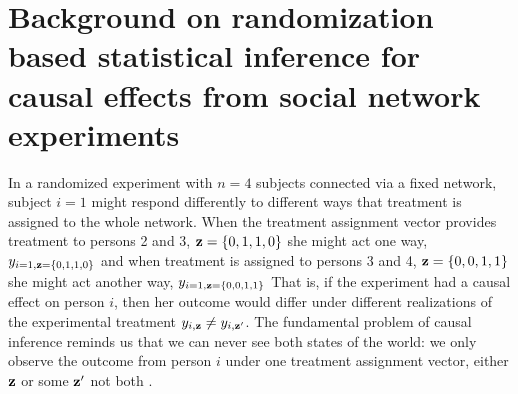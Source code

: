 

\section{Background on randomization based statistical inference for causal effects from social network experiments}

In a randomized experiment with $n=4$ subjects connected via a fixed network,
subject $i=1$ might respond differently to different ways that treatment is
assigned to the whole network. When the treatment assignment vector provides
treatment to persons 2 and 3, $\mathbf{z}=\{0,1,1,0\}$ she might act one way,
$y_{i=1,\mathbf{z}=\{0,1,1,0\}}$ and when treatment is assigned to persons 3 and 4,
$\mathbf{z}=\{0,0,1,1\}$ she might act another way, $y_{i=1,\mathbf{z}=\{0,0,1,1\}}$ That
is, if the experiment had a causal effect on person $i$, then her outcome
would differ under different realizations of the experimental treatment
$y_{i,\mathbf{z}} \ne y_{i,\mathbf{z}'}$. The fundamental problem of causal inference
reminds us that we can never see both states of the world: we only observe the
outcome from person $i$ under one treatment assignment vector, either $\mathbf{z}$ or
some $\mathbf{z}'$ not both  \citep{holland:1986a,brady2008cae}.

